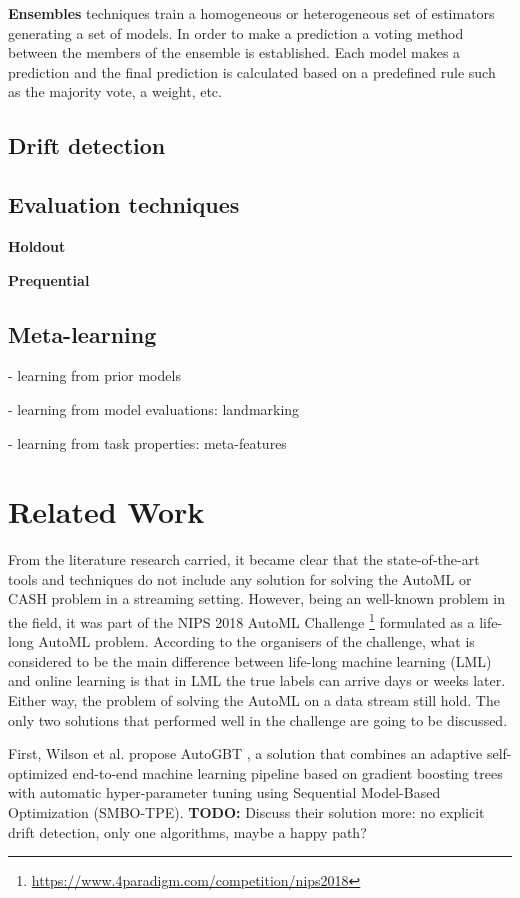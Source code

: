 \documentclass{sig-alternate-br}
\begin{document}
\textbf{Ensembles} techniques train a homogeneous \cite{bifet2012ensembles} or heterogeneous \cite{van2018online} set of estimators generating a set of models. In order to make a prediction a voting method between the members of the ensemble is established. Each model makes a prediction and the final prediction is calculated based on a predefined rule such as the majority vote, a weight, etc.

\subsection{Drift detection}

\subsection{Evaluation techniques}

\textbf{Holdout}

\textbf{Prequential}

\subsection{Meta-learning}

- learning from prior models

- learning from model evaluations: landmarking

- learning from task properties: meta-features

\section{Related Work}
\label{relatedwork}

From the literature research carried, it became clear that the state-of-the-art tools and techniques do not include any solution for solving the AutoML or CASH problem in a streaming setting. However, being an well-known problem in the field, it was part of the NIPS 2018 AutoML Challenge \footnote{\url{https://www.4paradigm.com/competition/nips2018}} formulated as a life-long AutoML problem. According to the organisers of the challenge, what is considered to be the main difference between life-long machine learning (LML) and online learning is that in LML the true labels can arrive days or weeks later. Either way, the problem of solving the AutoML on a data stream still hold. The only two solutions that performed well in the challenge are going to be discussed. 

First, Wilson et al. propose AutoGBT \cite{wilson2020automatically}, a solution that combines an adaptive self-optimized end-to-end machine learning pipeline
based on gradient boosting trees with automatic hyper-parameter tuning using Sequential Model-Based Optimization (SMBO-TPE). \textbf{TODO:} Discuss their solution more: no explicit drift detection, only one algorithms, maybe a happy path?
\end{document}
